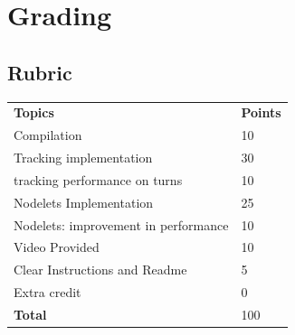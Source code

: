 \documentclass[letta4 paper]{article}
\numberwithin{equation}{section}
\newcommand{\0}{\mathbf{0}}
\begin{document}
	\section{Grading}
	
	
	\subsection{Rubric}
	\begin{table}[h]
		\begin{tabular}{ll}
			\textbf{Topics} & \textbf{Points} \\
			Compilation & 10 \\
			Tracking implementation	& 30 \\
			tracking performance on turns &	10 \\
			Nodelets Implementation &	25 \\
			Nodelets: improvement in performance &	10 \\
			Video Provided &	10 \\
			Clear Instructions and Readme &	5 \\
			Extra credit 	&  0 \\
			\textbf{Total} & 100 \\
		\end{tabular}
	\end{table}
	

	
			
\end{document}
